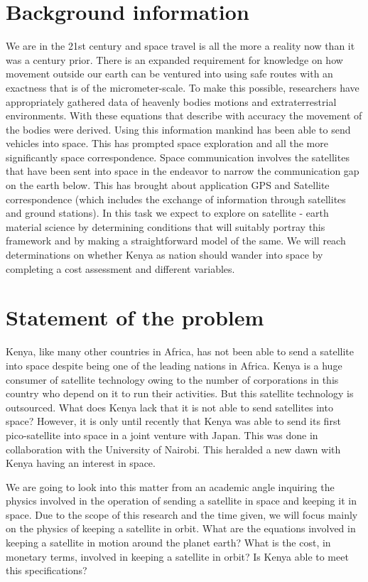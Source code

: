 \section{Background information}
We are in the 21st century and space travel is all the more a reality now than it was a century prior. There is an expanded requirement for knowledge on how movement outside our earth can be ventured into using safe routes with an exactness that is of the micrometer-scale. To make this possible, researchers have appropriately gathered data of heavenly bodies motions and extraterrestrial environments. With these equations that describe with accuracy the movement of the bodies were derived. Using this information mankind has been able to send vehicles into space. This has prompted space exploration and all the more significantly space correspondence. Space communication involves the satellites that have been sent into space in the endeavor to narrow the communication gap on the earth below. This has brought about application GPS and Satellite correspondence (which includes the exchange of information through satellites and ground stations). In this task we expect to explore on satellite - earth material science by determining conditions that will suitably portray this framework and by making a straightforward model of the same. We will reach determinations on whether Kenya as nation should wander into space by completing a cost assessment and different variables. 

\section{Statement of the problem}
Kenya, like many other countries in Africa,  has not been able to send a satellite into space despite being one of the leading nations in Africa. Kenya is a huge consumer of satellite technology owing to the number of corporations in this country who depend on it to run their activities. But this satellite technology is outsourced. What does Kenya lack that it is not able to send satellites into space?
However, it is only until recently that Kenya was able to send its first pico-satellite into space in a joint venture with Japan. This was done in collaboration with the University of Nairobi. This heralded a new dawn with Kenya having an interest in space.

We are going to look into this matter from an academic angle inquiring the physics involved in the operation of sending a satellite in space and keeping it in space. Due to the scope of this research and the time given, we will focus mainly on the physics of keeping a satellite in orbit. What are the equations involved in keeping a satellite in motion around the planet earth? What is the cost, in monetary terms, involved in keeping a satellite in orbit? Is Kenya able to meet this specifications?

